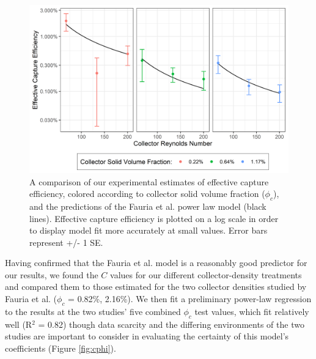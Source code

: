\documentclass[geosciences,article,submit,moreauthors,pdftex]{Definitions/mdpi}
\begin{document}
\begin{figure}[H]
\centering
\includegraphics[width=5in]{../pics/comparisonplot.png}
\caption{A comparison of our experimental estimates of effective capture efficiency, colored according to collector solid volume fraction ($\phi_c$), and the predictions of the Fauria et al. \cite{Fauria_2015} power law model (black lines). Effective capture efficiency is plotted on a log scale in order to display model fit more accurately at small values. Error bars represent +/- 1 SE.}
\label{fig:compplot}
\end{figure}   

Having confirmed that the Fauria et al. \cite{Fauria_2015} model is a reasonably good predictor for our results, we found the $C$ values for our different collector-density treatments and compared them to those estimated for the two collector densities studied by Fauria et al. ($\phi_c$ = 0.82\%, 2.16\%). We then fit a preliminary power-law regression to the results at the two studies' five combined $\phi_c$ test values, which fit relatively well (R$^2$ = 0.82) though data scarcity and the differing environments of the two studies are important to consider in evaluating the certainty of this model's coefficients (Figure \ref{fig:cphi}).
\end{document}
